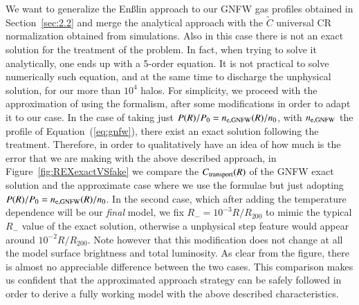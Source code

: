 \documentclass[traditabstract]{aa}
\begin{document}
\begin{appendix}
We want to generalize the En{\ss}lin approach to our GNFW gas profiles obtained in Section~\ref{sec:2.2} and merge the \cite{2011A&A...527A..99E} analytical approach with the $\tilde{C}$ universal CR normalization obtained from simulations. Also in this case there is not an exact solution for the \cite{2011A&A...527A..99E} treatment of the problem. In fact, when trying to solve it analytically, one ends up with a 5-order equation. It is not practical to solve numerically such equation, and at the same time to discharge the unphysical solution, for our more than $10^4$ halos. For simplicity, we proceed with the approximation of using the \cite{2011A&A...527A..99E} formalism, after some modifications in order to adapt it to our case. In the case of taking just $P(R)/P_{0}=n_{\rm{e,GNFW}}(R)/n_{0}$, with $n_{\rm{e,GNFW}}$ the profile of Equation~(\ref{eq:gnfw}), there exist an exact solution following the \cite{2011A&A...527A..99E} treatment. Therefore, in order to qualitatively have an idea of how much is the error that we are making with the above described approach, in Figure~\ref{fig:REXexactVSfake} we compare the $C_{\rm{transport}}(R)$ of the GNFW exact solution and the approximate case where we use the \cite{2011A&A...527A..99E} formulae but just adopting $P(R)/P_{0}=n_{\rm{e,GNFW}}(R)/n_{0}$. In the second case, which after adding the temperature dependence will be our \emph{final} model, we fix $R_{-}=10^{-3}R/R_{200}$ to mimic the typical $R_{-}$ value of the exact solution, otherwise a unphysical step feature would appear around $10^{-2}R/R_{200}$. Note however that this modification does not change at all the model surface brightness and total luminosity. As clear from the figure, there is almost no appreciable difference between the two cases. 
This comparison makes us confident that the approximated approach strategy can be safely followed in order to derive a fully working model with the above described characteristics.


\end{appendix}
\end{document}
